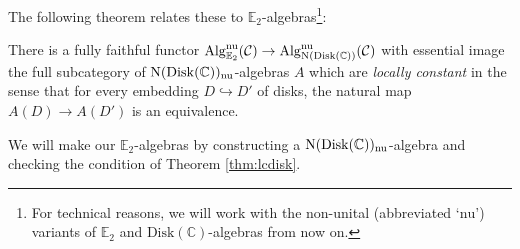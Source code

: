 The following theorem relates these to $\mathbb{E}_2$-algebras\footnote{For technical reasons, we will work with the non-unital (abbreviated `$\mathrm{nu}$') variants of $\mathbb{E}_2$ and $\mathrm{Disk}(\mathbb{C})$-algebras from now on.}:

\begin{thm}\label{thm:lcdisk}
There is a fully faithful functor $\operatorname{\mathrm{Alg}}^{\mathrm{nu}}_{\mathbb{E}_2}(\operatorname{\mathcal{C}}) \to \operatorname{\mathrm{Alg}}^{\mathrm{nu}}_{\operatorname{\mathrm{N}}(\mathrm{Disk}(\mathbb{C}))}(\operatorname{\mathcal{C}})$ with essential image the full subcategory of $\operatorname{\mathrm{N}}(\mathrm{Disk}(\mathbb{C}))_{\mathrm{nu}}$-algebras $A$ which are \emph{locally constant} in the sense that for every embedding $D\hookrightarrow D'$ of disks, the natural map $A(D)\to A(D')$ is an equivalence.  
\end{thm}

We will make our $\mathbb{E}_2$-algebras by constructing a $\operatorname{\mathrm{N}}(\mathrm{Disk}(\mathbb{C}))_{\mathrm{nu}}$-algebra and checking the condition of Theorem \ref{thm:lcdisk}.  

